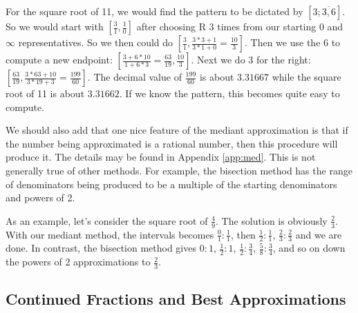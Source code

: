 \documentclass[12pt]{article}
\begin{document}
For the square root of 11, we would find the pattern to be dictated by $[3;\overline{3,6}]$. So we would start with $[\tfrac{3}{1}, \tfrac{1}{0}]$ after choosing R 3 times from our starting 0 and $\infty$ representatives. So we then could do $[\tfrac{3}{1}, \tfrac{3*3 + 1}{3*1 + 0} = \tfrac{10}{3}]$. Then we use the 6 to compute a new endpoint:  $[\tfrac{3+6*10}{1+6*3} = \tfrac{63}{19}, \tfrac{10}{3}]$. Next we do 3 for the right:  $[\tfrac{63}{19}, \tfrac{3*63+10}{3*19+3} = \tfrac{199}{60}]$. The decimal value of $\tfrac{199}{60}$ is about $3.31667$ while the square root of 11 is about $3.31662$. If we know the pattern, this becomes quite easy to compute. 

We should also add that one nice feature of the mediant approximation is that if the number being approximated is a rational number, then this procedure will produce it. The details may be found in Appendix \ref{app:med}. This is not generally true of other methods. For example, the bisection method has the range of denominators being produced to be a multiple of the starting denominators and powers of 2. 

As an example, let's consider the square root of $\frac{4}{9}$. The solution is obviously $\frac{2}{3}$. With our mediant method, the intervals becomes $\frac{0}{1}:\frac{1}{1}$, then $\frac{1}{2}:\frac{1}{1}$, $\frac{2}{3}:\frac{2}{3}$ and we are done. In contrast, the bisection method gives $0:1$, $\frac{1}{2}:1$, $\frac{1}{2}:\frac{3}{4}$, $\frac{5}{8}:\frac{3}{4}$, and so on down the powers of 2 approximations to $\frac{2}{3}$. 

\subsection{Continued Fractions and Best Approximations}
\end{document}
